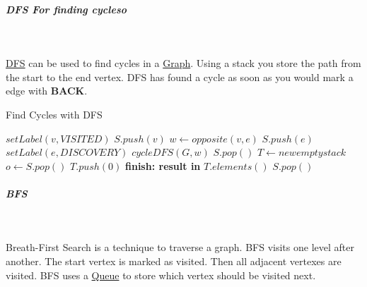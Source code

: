 \documentclass[11pt,twoside,twocolumn,landscape]{article}
\begin{document}
\subparagraph{DFS For finding cycleso} \
\label{sec:orgcf6b4f3}

\href{../../../roam/20220202095038-dfs.org}{DFS} can be used to find cycles in a \href{../../../roam/20220201163000-graph.org}{Graph}.
Using a stack you store the path from the start to the end vertex.
DFS has found a cycle as soon as you would mark a edge with \textbf{BACK}.


\begin{algorithm}
  \caption{Find Cycles with DFS}
  \begin{algorithmic}
    \State $setLabel(v, VISITED)$
    \State $S.push(v)$
    \State $w \leftarrow opposite(v, e)$
    \State $S.push(e)$
    \State $setLabel(e, DISCOVERY)$
    \State $cycleDFS(G, w)$
    \State $S.pop()$
    \Else
    \State $T \leftarrow new empty stack$
    \Repeat
    \State $o \leftarrow S.pop()$
    \State $T.push(0)$
    \State \textbf{finish: result in} $T.elements()$
    \EndIf
    \EndIf
    \EndFor
    \State $S.pop()$
    \EndProcedure
  \end{algorithmic}
\end{algorithm}

\subparagraph{BFS} \
\label{sec:org8f8be1e}

Breath-First Search is a technique to traverse a graph.
BFS visits one level after another.
The start vertex is marked as visited.
Then all adjacent vertexes are visited.
BFS uses a \href{../../../roam/20210806221243-queue.org}{Queue} to store which vertex should be visited next.
\end{document}
